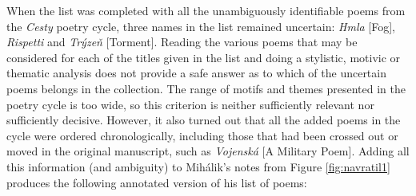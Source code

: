 \documentclass{article}
\begin{document}
When the list was completed with all the unambiguously identifiable
poems from the \emph{Cesty} poetry cycle, three names in the list
remained uncertain: \emph{Hmla} [Fog], \emph{Rispetti} and \emph{Trýzeň}
[Torment]. Reading the various poems that may be considered for each of
the titles given in the list and doing a stylistic, motivic or thematic
analysis does not provide a safe answer as to which of the uncertain
poems belongs in the collection. The range of motifs and themes
presented in the poetry cycle is too wide, so this criterion is neither
sufficiently relevant nor sufficiently decisive. However, it also turned
out that all the added poems in the cycle were ordered chronologically,
including those that had been crossed out or moved in the original manuscript, such as
\emph{Vojenská} [A Military Poem]. Adding all this information (and ambiguity) to Mihálik's notes from Figure \ref{fig:navratil1} produces the following annotated version of his list of poems:
\end{document}
